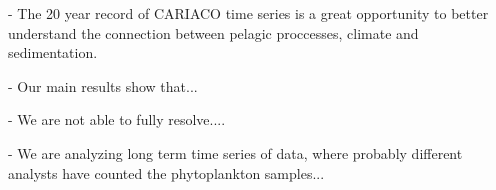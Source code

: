 \documentclass[draft]{agujournal2019}
\begin{document}
- The 20 year record of CARIACO time series is a great opportunity to better understand the connection between pelagic proccesses, climate and sedimentation. 

- Our main results show that...

- We are not able to fully resolve....


- We are analyzing long term time series of data, where probably different analysts have counted the phytoplankton samples...
\end{document}
